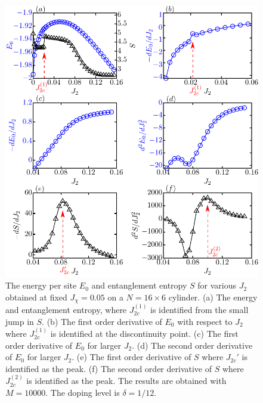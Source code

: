 \documentclass[aps,prx,reprint,superscriptaddress,showpacs]{revtex4-2}
\newcommand{\oim}[1]{{\color{blue} #1}}
\begin{document}
 \begin{figure}
\centering
\includegraphics[width=1\linewidth]{Nature_Phase_tranistion.pdf}
\caption{\oim{The energy per site $E_{0}$ and entanglement entropy $S$ for various $J_{2}$ obtained at fixed $J_{\chi }=0.05$ on a $N=16\times 6$ cylinder. (a) The energy and entanglement entropy, where $J_{2c}^{(1)}$ is identified from  the small jump in $S$. 
(b) The first order derivative of $E_{0}$ with respect to $J_{2}$ where $J_{2c}^{(1)}$ is  identified at the discontinuity point. (c) The first order derivative of $E_{0}$ for larger $J_{2}$. (d) The second order derivative of $E_{0}$ for larger $J_{2}$. (e) The first order derivative of $S$ where $J_{2c}'$ is identified as the peak. (f) The second order derivative of $S$ where $J_{2c}^{(2)}$ is identified as the peak. The results are obtained with $M=10000$. The doping level is $\delta=1/12$.}}
\label{Fig_nature_transiton}
\end{figure}
 
\end{document}
